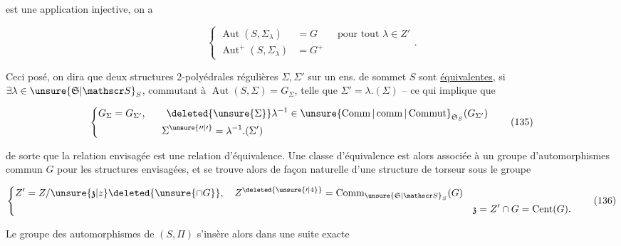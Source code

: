 est une application injective, on a

\[
 \left\{\begin{aligned}
 \operatorname{Aut}(S,\Sigma_\lambda)&=G\qquad\text{pour tout }\lambda\in Z'\\
 \operatorname{Aut}^{+}(S,\Sigma_\lambda)&=G^+
 \end{aligned}\right. .
 \tag*{(134)}
\]

Ceci posé, on dira que deux structures 2-polyédrales  régulières $\Sigma,\Sigma'$ sur un ens. de sommet $S$ sont  \uline{équivalentes}, si $\exists\lambda\in\unsure{\mathfrak S|\mathscr S}_S$, commutant à $\operatorname{Aut}(S,\Sigma)=G_\Sigma$, telle que $\Sigma'=\lambda.(\Sigma)$ -- ce qui implique que

\[
 \left\{\begin{aligned}
 G_\Sigma&=G_{\Sigma'},\qquad \deleted{\unsure{\Sigma}}\lambda^{-1}\in\unsure{\operatorname{Comm}|\operatorname{comm}|\operatorname{Commut}}_{\mathfrak S_S}(G_{\Sigma'})\\
 &\hspace{5em}\Sigma^{\unsure{\prime\prime|\prime}}=\lambda^{-1}.(\Sigma')
 \end{aligned}\right.
 \tag*{(135)}
\]


de sorte que la relation envisagée est une relation d'équivalence. Une classe d'équivalence  est alors associée à un groupe d'automorphismes commun $G$ pour les structures envisagées, et se trouve alors  de façon naturelle d'une structure de torseur sous le groupe

\[
 \left\{\begin{aligned}
 Z'&=Z/\unsure{\mathfrak z|z}\deleted{\unsure{\cap G}},\quad
 Z^{\deleted{\unsure{\prime|4}}}=\operatorname{Comm}_{\unsure{\mathfrak S|\mathscr S}_S}(G)\\
 &&\mathfrak z=Z'\cap G=\operatorname{Cent}(G).
 \end{aligned}\right.
 \tag*{(136)}
\]

Le groupe des automorphismes de $(S,\Pi)$   s'insère alors dans une suite exacte


